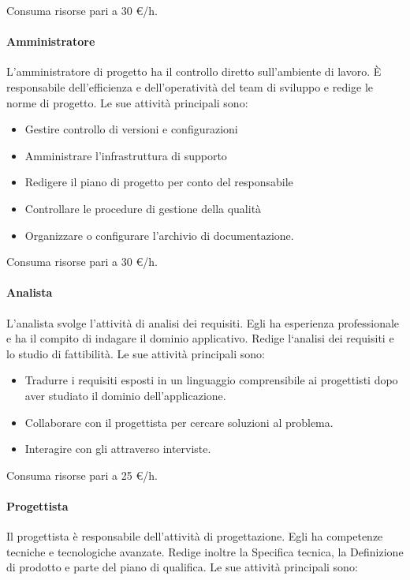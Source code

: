 \documentclass[../../norme-di-progetto.tex]{subfiles}
\begin{document}
Consuma risorse pari a 30 €/h.

\paragraph{Amministratore}%
\label{par:amministratore}
L'amministratore di progetto ha il controllo diretto sull'ambiente di lavoro. È responsabile dell'efficienza e dell'operatività del team di sviluppo e redige le norme di progetto. Le sue attività principali sono:

\begin{itemize}
  \item Gestire controllo di versioni e configurazioni
  \item Amministrare l'infrastruttura di supporto
  \item Redigere il piano di progetto per conto del responsabile
  \item Controllare le procedure di gestione della qualità
  \item Organizzare o configurare l'archivio di documentazione.
\end{itemize}

Consuma risorse pari a 30 €/h.

\paragraph{Analista}%
\label{par:analista}
L'analista svolge l'attività di analisi dei requisiti.
Egli ha esperienza professionale e ha il compito di indagare il dominio applicativo.
Redige l`analisi dei requisiti e lo studio di fattibilità. Le sue attività principali sono:

\begin{itemize}
  \item Tradurre i requisiti esposti in un linguaggio comprensibile ai progettisti dopo aver studiato il dominio dell'applicazione.
  \item Collaborare con il progettista per cercare soluzioni al problema.
  \item Interagire con gli  attraverso interviste.
\end{itemize}

Consuma risorse pari a 25 €/h.

\paragraph{Progettista}%
\label{par:progettista}
Il progettista è responsabile dell'attività di progettazione.
Egli ha competenze tecniche e tecnologiche avanzate.
Redige inoltre la Specifica tecnica, la Definizione di prodotto e parte del piano di qualifica.
Le sue attività principali sono:
\end{document}
